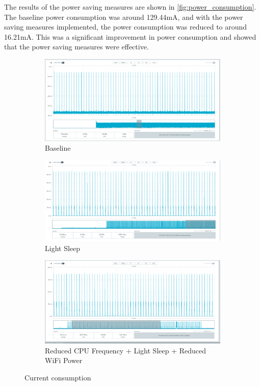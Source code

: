 \documentclass{article}
\begin{document}
The results of the power saving measures are shown in \autoref{fig:power_consumption}. The baseline power consumption was around 129.44mA, and with the power saving measures implemented, the power consumption was reduced to around 16.21mA. This was a significant improvement in power consumption and showed that the power saving measures were effective.
\begin{figure}[ht!]
    \centering
    \begin{subfigure}[b]{0.45\textwidth}
        \includegraphics[width=\textwidth]{baseline.png}
        \caption{Baseline}
    \end{subfigure}
    \begin{subfigure}[b]{0.45\textwidth}
        \includegraphics[width=\textwidth]{2nd benchmark.png}
        \caption{Light Sleep}
    \end{subfigure}    
    \begin{subfigure}[b]{0.45\textwidth}
        \includegraphics[width=\textwidth]{3rd benchmark.png}
        \caption{Reduced CPU Frequency + Light Sleep + Reduced WiFi Power}
    \end{subfigure}
    \caption{Current consumption}
    \label{fig:power_consumption}
\end{figure}
\end{document}
